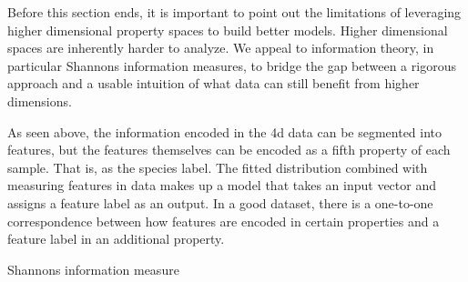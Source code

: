 Before this section ends, it is important to point out the limitations of leveraging higher dimensional property spaces to build better models. Higher dimensional spaces are inherently harder to analyze. We appeal to information theory, in particular Shannons information measures, to bridge the gap between a rigorous approach and a usable intuition of what data can still benefit from higher dimensions.

As seen above, the information encoded in the 4d data can be segmented into features, but the features themselves can be encoded as a fifth property of each sample. That is, as the species label. The fitted distribution combined with measuring features in data makes up a model that takes an input vector and assigns a feature label as an output. In a good dataset, there is a one-to-one correspondence between how features are encoded in certain properties and a feature label in an additional property.

Shannons information measure

